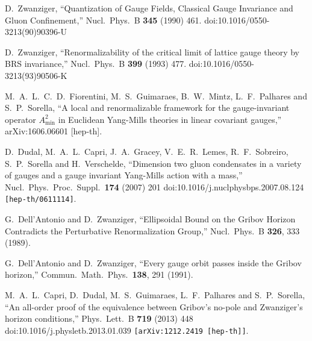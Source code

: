 \documentclass[a4paper,11pt,british,twosides]{book}%
\numberwithin{equation}{section}
\begin{document}
\begin{thebibliography}{9}
  D.~Zwanziger,
  ``Quantization of Gauge Fields, Classical Gauge Invariance and Gluon Confinement,''
  Nucl.\ Phys.\ B {\bf 345} (1990) 461.
  doi:10.1016/0550-3213(90)90396-U



  D.~Zwanziger,
  ``Renormalizability of the critical limit of lattice gauge theory by BRS invariance,''
  Nucl.\ Phys.\ B {\bf 399} (1993) 477.
  doi:10.1016/0550-3213(93)90506-K

  M.~A.~L.~C.~D.~Fiorentini, M.~S.~Guimaraes, B.~W.~Mintz, L.~F.~Palhares and S.~P.~Sorella,
  ``A local and renormalizable framework for the gauge-invariant operator $A^2_{\min}$ in
  Euclidean Yang-Mills theories in linear covariant gauges,''
  arXiv:1606.06601 [hep-th].

  D.~Dudal, M.~A.~L.~Capri, J.~A.~Gracey, V.~E.~R.~Lemes, R.~F.~Sobreiro, S.~P.~Sorella and
  H.~Verschelde,
  ``Dimension two gluon condensates in a variety of gauges and a gauge invariant Yang-Mills
  action with a mass,''
  Nucl.\ Phys.\ Proc.\ Suppl.\  {\bf 174} (2007) 201
  doi:10.1016/j.nuclphysbps.2007.08.124
  {\tt[hep-th/0611114]}.

  G.~Dell'Antonio and D.~Zwanziger,
  ``Ellipsoidal Bound on the Gribov Horizon Contradicts the Perturbative Renormalization
  Group,''
  Nucl.\ Phys.\ B {\bf 326}, 333 (1989).
  
  G.~Dell'Antonio and D.~Zwanziger,
  ``Every gauge orbit passes inside the Gribov horizon,''
  Commun.\ Math.\ Phys.\  {\bf 138}, 291 (1991).

  M.~A.~L.~Capri, D.~Dudal, M.~S.~Guimaraes, L.~F.~Palhares and S.~P.~Sorella,
  ``An all-order proof of the equivalence between Gribov's no-pole and Zwanziger's horizon
  conditions,''
  Phys.\ Lett.\ B {\bf 719} (2013) 448
  doi:10.1016/j.physletb.2013.01.039
  {\tt [arXiv:1212.2419 [hep-th]]}.


\end{thebibliography}
\end{document}
